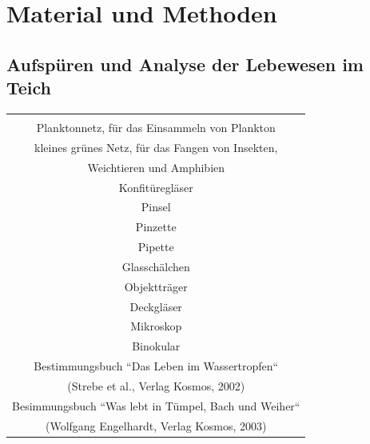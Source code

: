 \documentclass{article}
\begin{document}
\section{Material und Methoden}
    
    \subsection{Aufspüren und Analyse der Lebewesen im Teich}
    
    
        \begin{table}[h!]
        \centering
        \begin{tabular}{|c|} 
         \hline
         \\
         Planktonnetz, für das Einsammeln von Plankton \\
         kleines grünes Netz, für das Fangen von Insekten, \\ Weichtieren und Amphibien \\
         Konfitüregläser \\
         Pinsel \\
         Pinzette \\
         Pipette \\
         Glasschälchen \\
         Objektträger \\
         Deckgläser \\
         Mikroskop \\
         Binokular \\
         Bestimmungsbuch ``Das Leben im Wassertropfen`` \\ (Strebe et al., Verlag Kosmos, 2002) \\
         Besimmungsbuch ``Was lebt in Tümpel, Bach und Weiher`` \\ (Wolfgang Engelhardt, Verlag Kosmos, 2003) \\[2ex]
         \hline
        \end{tabular}
        \label{Tiere}
        \end{table}
        
\end{document}
